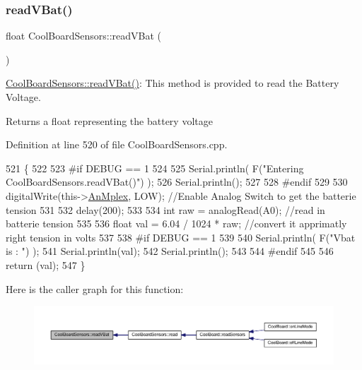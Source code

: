 \subsubsection{\texorpdfstring{read\+V\+Bat()}{readVBat()}}
{\footnotesize\ttfamily float Cool\+Board\+Sensors\+::read\+V\+Bat (\begin{DoxyParamCaption}{ }\end{DoxyParamCaption})}

\hyperlink{class_cool_board_sensors_a6944b6ea7bce8e2fce1b434acfd9d5f3}{Cool\+Board\+Sensors\+::read\+V\+Bat()}\+: This method is provided to read the Battery Voltage.

\begin{DoxyReturn}{Returns}
a float representing the battery voltage 
\end{DoxyReturn}


Definition at line 520 of file Cool\+Board\+Sensors.\+cpp.


\begin{DoxyCode}
521 \{
522 
523 \textcolor{preprocessor}{#if DEBUG == 1}
524 
525     Serial.println( F(\textcolor{stringliteral}{"Entering CoolBoardSensors.readVBat()"}) );
526     Serial.println();
527 
528 \textcolor{preprocessor}{#endif}
529 
530     digitalWrite(this->\hyperlink{class_cool_board_sensors_a12ef28b1046219e0aee10bf64e28c4a5}{AnMplex}, LOW);                            \textcolor{comment}{//Enable Analog Switch to get the
       batterie tension}
531     
532     delay(200);
533     
534     \textcolor{keywordtype}{int} raw = analogRead(A0);                                    \textcolor{comment}{//read in batterie tension}
535     
536     \textcolor{keywordtype}{float} val = 6.04 / 1024 * raw;                               \textcolor{comment}{//convert it apprimatly right tension in
       volts}
537     
538 \textcolor{preprocessor}{#if DEBUG == 1}
539 
540     Serial.println( F(\textcolor{stringliteral}{"Vbat is : "}) );
541     Serial.println(val);
542     Serial.println();
543 
544 \textcolor{preprocessor}{#endif}
545 
546     \textcolor{keywordflow}{return} (val);   
547 \}
\end{DoxyCode}
Here is the caller graph for this function\+:\nopagebreak
\begin{figure}[H]
\begin{center}
\leavevmode
\includegraphics[width=350pt]{de/d46/class_cool_board_sensors_a6944b6ea7bce8e2fce1b434acfd9d5f3_icgraph}
\end{center}
\end{figure}
\mbox{\label{class_cool_board_sensors_a406307ffd70272282d91479c7ed8d66f}} 
